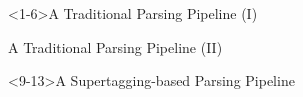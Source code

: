 \documentclass[slides]{subfiles}
\begin{document}
    \begin{frame}<1-6>{A Traditional Parsing Pipeline (I)}
        \resizebox{\linewidth}{!}{}
    \end{frame}

    \begin{frame}{A Traditional Parsing Pipeline (II)}
        \centering
        
    \end{frame}

    \begin{frame}<9-13>{A Supertagging-based Parsing Pipeline \citep{bangalore1999supertagging}}
        \resizebox{\linewidth}{!}{}
    \end{frame}
\end{document}
